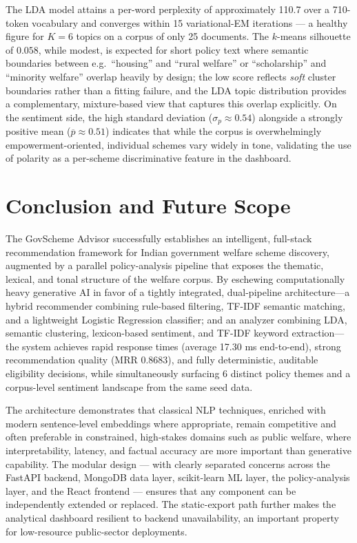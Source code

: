 \documentclass[10pt, journal, twocolumn]{IEEEtran}
\begin{document}
The LDA model attains a per-word perplexity of approximately 110.7 over a 710-token vocabulary and converges within 15 variational-EM iterations --- a healthy figure for $K=6$ topics on a corpus of only 25 documents. The $k$-means silhouette of $0.058$, while modest, is expected for short policy text where semantic boundaries between e.g.\ ``housing'' and ``rural welfare'' or ``scholarship'' and ``minority welfare'' overlap heavily by design; the low score reflects \emph{soft} cluster boundaries rather than a fitting failure, and the LDA topic distribution provides a complementary, mixture-based view that captures this overlap explicitly. On the sentiment side, the high standard deviation ($\sigma_p \approx 0.54$) alongside a strongly positive mean ($\overline{p} \approx 0.51$) indicates that while the corpus is overwhelmingly empowerment-oriented, individual schemes vary widely in tone, validating the use of polarity as a per-scheme discriminative feature in the dashboard.

\section{Conclusion and Future Scope}
The GovScheme Advisor successfully establishes an intelligent, full-stack recommendation framework for Indian government welfare scheme discovery, augmented by a parallel policy-analysis pipeline that exposes the thematic, lexical, and tonal structure of the welfare corpus. By eschewing computationally heavy generative AI in favor of a tightly integrated, dual-pipeline architecture---a hybrid recommender combining rule-based filtering, TF-IDF semantic matching, and a lightweight Logistic Regression classifier; and an analyzer combining LDA, semantic clustering, lexicon-based sentiment, and TF-IDF keyword extraction---the system achieves rapid response times (average 17.30 ms end-to-end), strong recommendation quality (MRR 0.8683), and fully deterministic, auditable eligibility decisions, while simultaneously surfacing 6 distinct policy themes and a corpus-level sentiment landscape from the same seed data.

The architecture demonstrates that classical NLP techniques, enriched with modern sentence-level embeddings where appropriate, remain competitive and often preferable in constrained, high-stakes domains such as public welfare, where interpretability, latency, and factual accuracy are more important than generative capability. The modular design --- with clearly separated concerns across the FastAPI backend, MongoDB data layer, scikit-learn ML layer, the policy-analysis layer, and the React frontend --- ensures that any component can be independently extended or replaced. The static-export path further makes the analytical dashboard resilient to backend unavailability, an important property for low-resource public-sector deployments.
\end{document}

